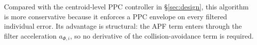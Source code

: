 \begin{remark}
Compared with the centroid-level PPC controller in \S\ref{sec:design}, this
algorithm is more conservative because it enforces a PPC envelope on every
filtered individual error.  Its advantage is structural: the APF term enters
through the filter acceleration $a_{\Phi,i}$, so no derivative of the
collision-avoidance term is required.
\end{remark}
